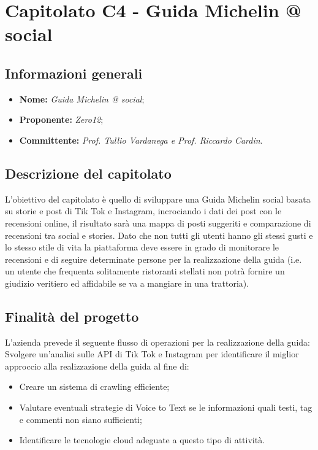 \section{Capitolato C4 - Guida Michelin @ social}\label{section:c4}

\subsection {Informazioni generali}
    \begin{itemize}
        \item \textbf{Nome:} \textit{Guida Michelin @ social};
        \item \textbf{Proponente:} \textit{Zero12};
        \item \textbf{Committente:} \textit{Prof. Tullio Vardanega e Prof. Riccardo Cardin}.
    \end{itemize}

\subsection{Descrizione del capitolato}
    L'obiettivo del capitolato è quello di sviluppare una Guida Michelin social basata su storie e post di Tik Tok e Instagram, incrociando i dati dei post con le recensioni online, il risultato sarà una mappa di posti suggeriti e comparazione di recensioni tra social e stories.
    Dato che non tutti gli utenti hanno gli stessi gusti e lo stesso stile di vita la piattaforma deve essere in grado di monitorare le recensioni e di seguire determinate persone per la realizzazione della guida (i.e. un utente che frequenta solitamente ristoranti stellati non potrà fornire un giudizio veritiero ed affidabile se va a mangiare in una trattoria).

\subsection {Finalità del progetto}
    L'azienda prevede il seguente flusso di operazioni per la realizzazione della guida:
    Svolgere un'analisi sulle API di Tik Tok e Instagram per identificare il miglior approccio alla realizzazione della guida al fine di: 
    \begin{itemize}
        \item Creare un sistema di crawling efficiente;
        \item Valutare eventuali strategie di Voice to Text se le informazioni quali testi, tag e commenti non siano sufficienti;
        \item Identificare le tecnologie cloud adeguate a questo tipo di attività.
\end{itemize}

